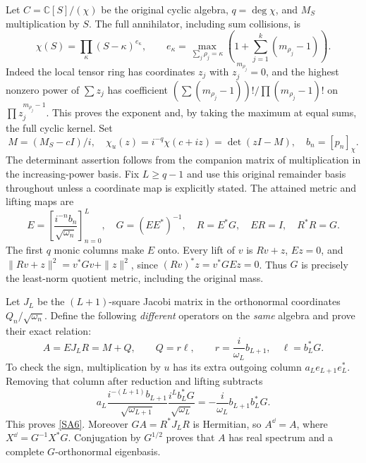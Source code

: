 \documentclass[11pt]{article}
\newcommand{\C}{\mathbb C}\newcommand{\R}{\mathbb R}
\begin{document}
Let $C=\C[S]/(\chi)$ be the original cyclic algebra,
$q=\deg\chi$, and $M_S$ multiplication by $S$.
The full annihilator, including sum collisions, is
\begin{equation}\tag{SA3}\label{SA3}
\chi(S)=\prod_\kappa(S-\kappa)^{e_\kappa},
\qquad
e_\kappa=\max_{\sum_j\rho_j=\kappa}
\left(1+\sum_{j=1}^k(m_{\rho_j}-1)\right).
\end{equation}
Indeed the local tensor ring has coordinates $z_j$ with
$z_j^{m_{\rho_j}}=0$, and the highest nonzero power of
$\sum z_j$ has coefficient
$(\sum(m_{\rho_j}-1))!/\prod(m_{\rho_j}-1)!$ on
$\prod z_j^{m_{\rho_j}-1}$. This proves the exponent and,
by taking the maximum at equal sums, the full cyclic kernel.
Set
\begin{equation}\tag{SA4}\label{SA4}
M=(M_S-cI)/i,\quad
\chi_u(z)=i^{-q}\chi(c+iz)=\det(zI-M),\quad b_n=[p_n]_\chi.
\end{equation}
The determinant assertion follows from the companion
matrix of multiplication in the increasing-power basis.
Fix $L\geq q-1$ and use this original remainder basis
throughout unless a coordinate map is explicitly stated.
The attained metric and lifting maps are
\begin{equation}\tag{SA5}\label{SA5}
E=\left[\frac{i^{-n}b_n}{\sqrt{\omega_n}}\right]_{n=0}^L,\quad
G=(EE^*)^{-1},\quad R=E^*G,\quad ER=I,\quad R^*R=G.
\end{equation}
The first $q$ monic columns make $E$ onto. Every lift of
$v$ is $Rv+z$, $Ez=0$, and
$\|Rv+z\|^2=v^*Gv+\|z\|^2$, since
$(Rv)^*z=v^*GEz=0$. Thus $G$ is precisely the least-norm
quotient metric, including the original mass.

Let $J_L$ be the $(L+1)$-square Jacobi matrix in the
orthonormal coordinates $Q_n/\sqrt{\omega_n}$.
Define the following \emph{different} operators on the
\emph{same} algebra and prove their exact relation:
\begin{equation}\tag{SA6}\label{SA6}
A=EJ_LR=M+Q,\qquad
Q=r\ell,\qquad
r=\frac{i}{\omega_L}b_{L+1},\quad \ell=b_L^*G.
\end{equation}
To check the sign, multiplication by $u$ has its extra
outgoing column $a_Le_{L+1}e_L^*$. Removing that column
after reduction and lifting subtracts
\[
a_L\frac{i^{-(L+1)}b_{L+1}}{\sqrt{\omega_{L+1}}}
\frac{i^Lb_L^*G}{\sqrt{\omega_L}}
=-\frac{i}{\omega_L}b_{L+1}b_L^*G.
\]
This proves \eqref{SA6}. Moreover $GA=R^*J_LR$ is
Hermitian, so $A^{\dd}=A$, where $X^{\dd}=G^{-1}X^*G$.
Conjugation by $G^{1/2}$ proves that $A$ has real spectrum
and a complete $G$-orthonormal eigenbasis.
\end{document}
